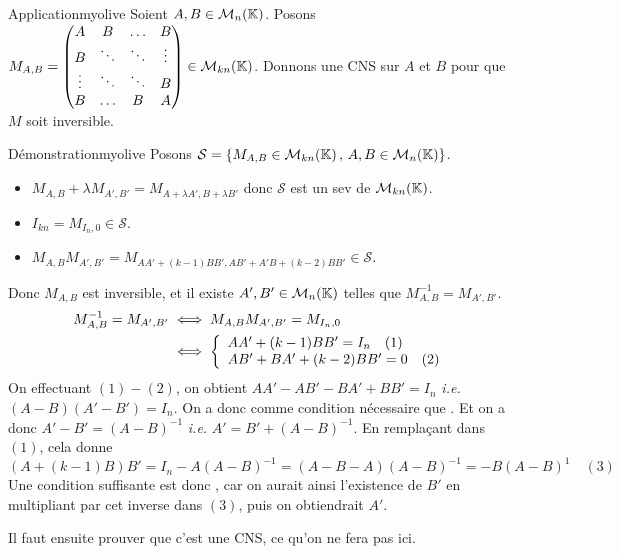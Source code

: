     \begin{omed}{Application}{myolive}
        Soient $A, B \in \mathcal{M}_{n}(\mathbb{K})$. Posons $M_{A,B} = \begin{pmatrix}
            A & B & \ldots & B \\
            B & \ddots & \ddots & \vdots \\
            \vdots & \ddots & \ddots & B \\
            B & \ldots & B & A
        \end{pmatrix} \in \mathcal{M}_{kn}(\mathbb{K})$. Donnons une CNS sur $A$ et $B$ pour que $M$ soit inversible.
    \end{omed}

    \begin{demo}{Démonstration}{myolive}
        Posons $\mathcal{S} = \left\{ M_{A,B} \in \mathcal{M}_{kn}(\mathbb{K}) \, , \, A,B \in \mathcal{M}_{n}(\mathbb{K}) \right\}$. 
        \begin{itemize}
            \item $M_{A,B} + \lambda M_{A',B'} = M_{A + \lambda A', B + \lambda B'}$ donc $\mathcal{S}$ est un sev de $\mathcal{M}_{kn}(\mathbb{K})$.
            \item $I_{kn} = M_{I_n, 0} \in \mathcal{S}$.
            \item $M_{A,B} M_{A',B'} = M_{AA' + (k-1) BB', AB' + A'B + (k-2)BB'} \in \mathcal{S}$.
        \end{itemize}
        Donc $M_{A,B}$ est inversible, et il existe $A',B' \in \mathcal{M}_{n}(\mathbb{K})$ telles que $M_{A,B}^{-1} = M_{A',B'}$.
        \begin{align*}
            M_{A,B}^{-1} = M_{A', B'}
            &\iff M_{A,B} M_{A',B'} = M_{I_n,0} \\
            &\iff \et{AA' + (k-1)BB' = I_n \eqlabel{1}}{AB' + BA' + (k-2)BB' = 0 \eqlabel{2}}
        \end{align*}
        On effectuant $(1) - (2)$, on obtient $AA' - AB' - BA' + BB' = I_n$ \textit{i.e.} $(A - B)(A' - B') = I_n$. On a donc comme \textcolor{myolive}{condition nécessaire} que . Et on a donc $A' - B' = (A-B)^{-1}$ \textit{i.e.} $A' = B' + (A-B)^{-1}$. En remplaçant dans $(1)$, cela donne \[ (A + (k-1)B)B' = I_n - A(A-B)^{-1} = (A-B-A)(A-B)^{-1} = -B(A-B)^1 \quad (3) \] 
        Une \textcolor{myolive}{condition suffisante} est donc , car on aurait ainsi l’existence de $B'$ en multipliant par cet inverse dans $(3)$, puis on obtiendrait $A'$. 

        Il faut ensuite prouver que c’est une CNS, ce qu’on ne fera pas ici.
    \end{demo}

